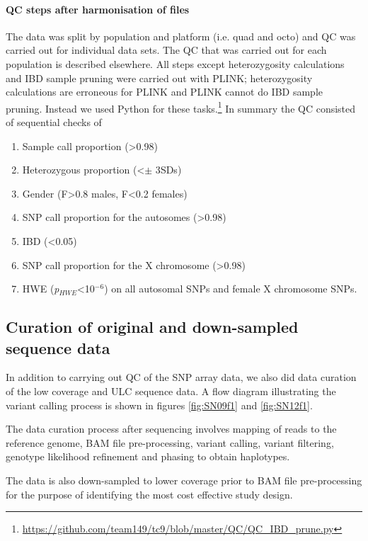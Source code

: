\paragraph{QC steps after harmonisation of files}
The data was split by population and platform (i.e. quad and octo) and \gls{QC} was carried out for individual data sets. The \gls{QC} that was carried out for each population is described elsewhere.\cite{Gurdasani2015} All steps except heterozygosity calculations and IBD sample pruning were carried out with PLINK; heterozygosity calculations are erroneous for PLINK and PLINK cannot do \gls{IBD} sample pruning. Instead we used Python for these tasks.\footnote{\url{https://github.com/team149/tc9/blob/master/QC/QC_IBD_prune.py}} In summary the QC consisted of sequential checks of
\begin{enumerate}
\item Sample call proportion (>0.98)
\item Heterozygous proportion (\textless $\pm$ 3\glspl{SD})
\item Gender (F>0.8 males, F<0.2 females)
\item SNP call proportion for the autosomes (\textgreater0.98)
\item IBD (<0.05)
\item SNP call proportion for the X chromosome (\textgreater0.98)
\item \gls{HWE} (\textit{p}$_{HWE}$<10$^{-6}$) on all autosomal SNPs and female X chromosome SNPs.
\end{enumerate}

\subsection{Curation of original and down-sampled sequence data}
In addition to carrying out \gls{QC} of the \gls{SNP} array data, we also did data curation of the low coverage and \gls{ULC} sequence data. A flow diagram illustrating the variant calling process is shown in figures \ref{fig:SN09f1} and \ref{fig:SN12f1}.



The data curation process after sequencing involves mapping of reads to the reference genome, \gls{BAM} file pre-processing, variant calling, variant filtering, genotype likelihood refinement and phasing to obtain haplotypes.

The data is also down-sampled to lower coverage prior to \gls{BAM} file pre-processing for the purpose of identifying the most cost effective study design.

